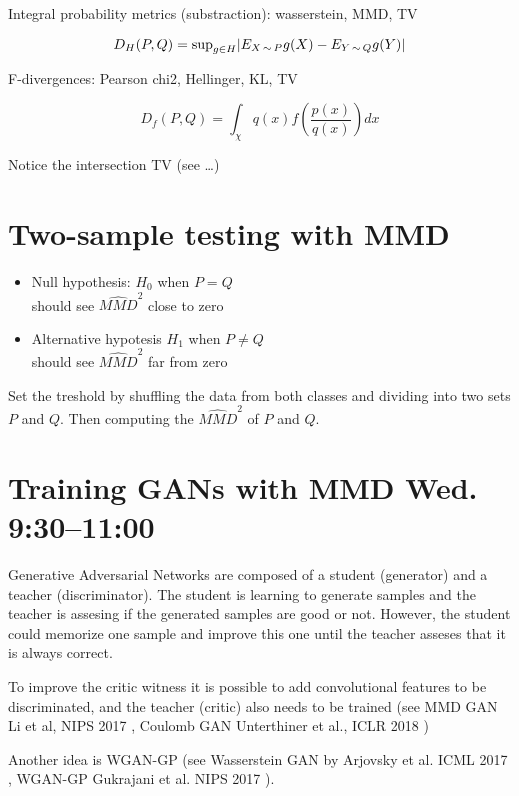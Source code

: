 Integral probability metrics (substraction): wasserstein, MMD, TV

\begin{equation}
  D_H(P,Q) = \text{sup}_{g \in H} | E_{X \operatorname*{\sim} P}g(X) - E_{Y \operatorname*{\sim} Q}g(Y)|
\end{equation}

F-divergences: Pearson chi2, Hellinger, KL, TV

\begin{equation}
  D_f(P,Q) = \int_\chi q(x) f(\frac{p(x)}{q(x)})dx
\end{equation}

Notice the intersection TV (see \dots)

\section{Two-sample testing with MMD}


\begin{itemize}
  \item Null hypothesis: $H_0$ when $P = Q$ \\
    should see $\hat{MMD}^2$ close to zero
  \item Alternative hypotesis $H_1$ when $P \ne Q$ \\
    should see $\hat{MMD}^2$ far from zero
\end{itemize}

Set the treshold by shuffling the data from both classes and dividing into two
sets $P$ and $Q$. Then computing the $\hat{MMD}^2$ of $P$ and $Q$.

\section{Training GANs with MMD Wed. 9:30--11:00}

Generative Adversarial Networks are composed of a student (generator) and a
teacher (discriminator). The student is learning to generate samples and the
teacher is assesing if the generated samples are good or not. However, the
student could memorize one sample and improve this one until the teacher
asseses that it is always correct.

To improve the critic witness it is possible to add convolutional features to
be discriminated, and the teacher (critic) also needs to be trained (see MMD
GAN Li et al, NIPS 2017 \cite{li2017mmd}, Coulomb GAN Unterthiner et al., ICLR
2018 \cite{unterthiner2017coulomb})

Another idea is WGAN-GP (see Wasserstein GAN by Arjovsky et al. ICML 2017
\cite{arjovsky2017wasserstein}, WGAN-GP Gukrajani et al. NIPS 2017
\cite{DBLP:journals/corr/GulrajaniAADC17}).


